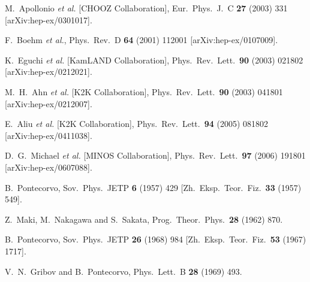 \documentclass[12pt]{elsart}
\begin{document}
\begin{thebibliography}{99}
  M.~Apollonio {\it et al.}  [CHOOZ Collaboration],
  Eur.\ Phys.\ J.\  C {\bf 27} (2003) 331
  [arXiv:hep-ex/0301017].
  
  F.~Boehm {\it et al.},
  Phys.\ Rev.\  D {\bf 64} (2001) 112001
  [arXiv:hep-ex/0107009].

  K.~Eguchi {\it et al.}  [KamLAND Collaboration],
  Phys.\ Rev.\ Lett.\  {\bf 90} (2003) 021802
  [arXiv:hep-ex/0212021].

  M.~H.~Ahn {\it et al.}  [K2K Collaboration],
  Phys.\ Rev.\ Lett.\  {\bf 90} (2003) 041801
  [arXiv:hep-ex/0212007].

  E.~Aliu {\it et al.}  [K2K Collaboration],
  Phys.\ Rev.\ Lett.\  {\bf 94} (2005) 081802
  [arXiv:hep-ex/0411038].

  D.~G.~Michael {\it et al.}  [MINOS Collaboration],
  Phys.\ Rev.\ Lett.\  {\bf 97} (2006) 191801
  [arXiv:hep-ex/0607088].

  B.~Pontecorvo,
  Sov.\ Phys.\ JETP {\bf 6} (1957) 429
  [Zh.\ Eksp.\ Teor.\ Fiz.\  {\bf 33} (1957) 549].

  Z.~Maki, M.~Nakagawa and S.~Sakata,
  Prog.\ Theor.\ Phys.\  {\bf 28} (1962) 870.

  B.~Pontecorvo,
  Sov.\ Phys.\ JETP {\bf 26} (1968) 984
  [Zh.\ Eksp.\ Teor.\ Fiz.\  {\bf 53} (1967) 1717].

  V.~N.~Gribov and B.~Pontecorvo,
  Phys.\ Lett.\  B {\bf 28} (1969) 493.


\end{thebibliography}
\end{document}
